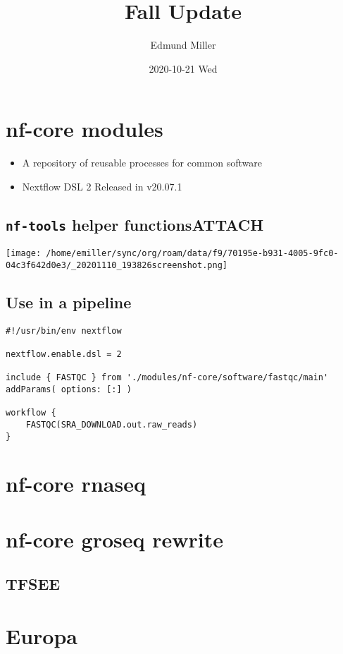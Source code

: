\documentclass[bigger]{beamer}
\author{Edmund Miller}
\date{2020-10-21 Wed}
\title{Fall Update}
\begin{document}
\maketitle

\section{nf-core modules}
\label{sec:org85f9e79}
\begin{itemize}
\item A repository of reusable processes for common software
\item Nextflow DSL 2 Released in v20.07.1
\end{itemize}
\subsection[\texttt{nf-tools} helper functions]{\texttt{nf-tools} helper functions\hfill{}\textsc{ATTACH}}
\label{sec:orgcd1d3c9}
\begin{center}
\texttt{[image: /home/emiller/sync/org/roam/data/f9/70195e-b931-4005-9fc0-04c3f642d0e3/\_20201110\_193826screenshot.png]}
\end{center}

\subsection{Use in a pipeline}
\label{sec:org3cd305b}
\begin{verbatim}
#!/usr/bin/env nextflow

nextflow.enable.dsl = 2

include { FASTQC } from './modules/nf-core/software/fastqc/main' addParams( options: [:] )

workflow {
    FASTQC(SRA_DOWNLOAD.out.raw_reads)    
}
\end{verbatim}

\section{nf-core rnaseq}
\label{sec:org5e6a6cf}
\section{nf-core groseq rewrite}
\label{sec:orgcab31f1}
\subsection{TFSEE}
\label{sec:org31a6922}
\section{Europa}
\label{sec:orga02c463}
\end{document}
